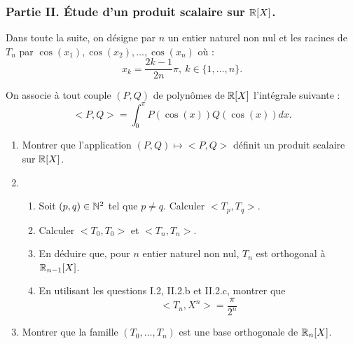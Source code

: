 \subsubsection*{Partie II. \'{E}tude d'un produit scalaire sur $\mathbb{R}[X]$.}

Dans toute la suite, on désigne par $n$ un entier naturel non nul et
les racines de $T_n$ par $\cos(x_1), \cos(x_2),\dots,\cos(x_n)$ où :
$$x_k=\frac{2k-1}{2n}\pi, \ k\in\{1,\dots,n\}.$$

On associe à tout couple $(P,Q)$ de polynômes de $\mathbb{R}[X]$ l'intégrale
suivante :
$$ <P,Q>=\int_0^\pi P(\cos(x))Q(\cos(x))dx.$$
\begin{enumerate}
  \item Montrer que l'application $(P,Q)\mapsto <P,Q>$ définit un
  produit scalaire sur $\mathbb{R}[X]$.
  \item \begin{enumerate}
          \item Soit $(p,q)\in\mathbb{N}^2$ tel que $p\neq q$. Calculer
          $<T_p,T_q>$.
          \item Calculer $<T_0,T_0>$ et $<T_n,T_n>$.
          \item En déduire que, pour $n$ entier naturel non nul, $T_n$ est orthogonal
          à $\mathbb{R}_{n-1}[X]$.
          \item En utilisant les questions I.2, II.2.b et II.2.c, montrer que
          \[<T_n,X^n>=\frac{\pi}{2^n}\]
        \end{enumerate}
  \item Montrer que la famille $(T_0,\dots,T_n)$ est une base
  orthogonale de $\mathbb{R}_n[X]$.

\end{enumerate}

